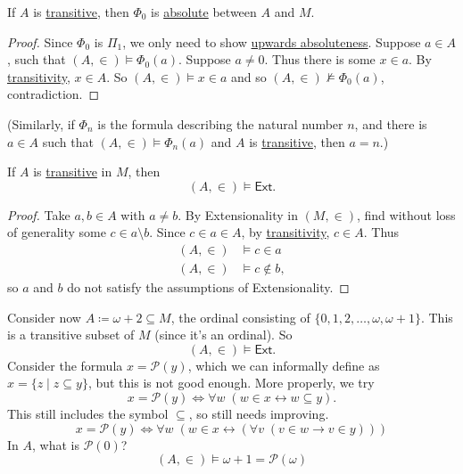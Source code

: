 \documentclass{article}
\newcommand{\named}[1]{\textbf{#1}\index{#1}}
\newcommand{\1}{\mathbbm{1}}
\let\models\vDash
\let\nModels\nvDash
\begin{document}
\begin{prop}
  If $A$ is \hyperlink{def:transitive}{transitive}, then \hyperlink{def:phi0}{$\Phi_0$} is \hyperlink{def:abso}{absolute} between $A$ and $M$.
\end{prop}
\begin{proof}
  Since \hyperlink{def:phi0}{$\Phi_0$} is \hyperlink{def:pi1}{$\Pi_1$}, we only need to show \hyperlink{def:abso}{upwards absoluteness}.
  Suppose $a \in A$, such that $(A,\in) \models \Phi_0(a)$.
  Suppose $a \neq 0$. Thus there is some $x \in a$. By \hyperlink{def:transitive}{transitivity}, $x \in A$.
  So $(A,\in) \models x \in a$ and so $(A,\in) \nModels \Phi_0(a)$, contradiction.
\end{proof}
(Similarly, if $\Phi_n$ is the formula describing the natural number $n$, and there is $a \in A$ such that $(A,\in) \models \Phi_n(a)$ and $A$ is \hyperlink{def:transitive}{transitive}, then $a = n$.)
\begin{prop}
  If $A$ is \hyperlink{def:transitive}{transitive} in $M$, then
  \begin{equation*}
    (A,\in) \models \textsf{Ext}.
  \end{equation*}
\end{prop}
\begin{proof}
  Take $a,b \in A$ with $a \neq b$.
  By Extensionality in $(M,\in)$, find without loss of generality some $c \in a \setminus b$.
  Since $c \in a \in A$, by \hyperlink{def:transitive}{transitivity}, $c \in A$.
  Thus
  \begin{align*}
    (A,\in) &\models c \in a \\
    (A,\in) &\models c \notin b,
  \end{align*}
  so $a$ and $b$ do not satisfy the assumptions of Extensionality.
\end{proof}

Consider now $A \coloneqq \omega + 2 \subseteq M$, the ordinal consisting of $\{0,1,2,\dotsc, \omega, \omega+1\}$.
This is a transitive subset of $M$ (since it's an ordinal).
So
\begin{equation*}
  (A,\in) \models \textsf{Ext}.
\end{equation*}
Consider the formula $x = \mathcal{P}(y)$, which we can informally define as $x = \{z \mid z \subseteq y\}$, but this is not good enough. More properly, we try
\begin{equation*}
  x = \mathcal{P}(y) \iff \forall w \; (w \in x \leftrightarrow w \subseteq y).
\end{equation*}
This still includes the symbol $\subseteq$, so still needs improving.
\begin{equation*}
  x = \mathcal{P}(y) \iff \forall w \; (w \in x \leftrightarrow (\forall v \; (v \in w \rightarrow v \in y)))
\end{equation*}
In $A$, what is $\mathcal{P}(0)$?
\begin{equation*}
  (A,\in) \models \omega + 1 = \mathcal{P}(\omega)
\end{equation*}
\end{document}
